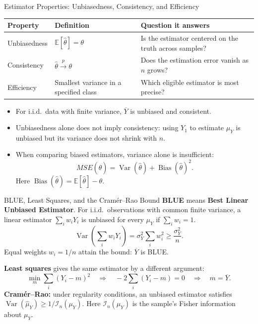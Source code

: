 \documentclass[10pt,aspectratio=169]{beamer}
\newcommand{\E}{\mathbb{E}}
\newcommand{\Var}{\operatorname{Var}}
\begin{document}
\begin{frame}{Estimator Properties: Unbiasedness, Consistency, and Efficiency}
\small
\begin{center}
\begin{tabular}{p{2.7cm}p{4.4cm}p{6cm}}
\toprule
Property & Definition & Question it answers\\
\midrule
Unbiasedness & $\E[\widehat\theta]=\theta$ & Is the estimator centered on the truth across samples?\\[6pt]
Consistency & $\widehat\theta\xrightarrow{p}\theta$ & Does the estimation error vanish as $n$ grows?\\[6pt]
Efficiency & Smallest variance in a specified class & Which eligible estimator is most precise?\\
\bottomrule
\end{tabular}
\end{center}
\begin{itemize}
\item For i.i.d.\ data with finite variance, $\overline Y$ is unbiased and consistent.
\item Unbiasedness alone does not imply consistency: using $Y_1$ to estimate $\mu_Y$ is unbiased but its variance does not shrink with $n$.
\item When comparing biased estimators, variance alone is insufficient:
\[
MSE(\widehat\theta)=\Var(\widehat\theta)+\operatorname{Bias}(\widehat\theta)^2.
\]
Here $\operatorname{Bias}(\widehat\theta)=\E[\widehat\theta]-\theta$.
\end{itemize}
\end{frame}

\begin{frame}{BLUE, Least Squares, and the Cramér--Rao Bound}
\small
\textbf{BLUE} means \textbf{Best Linear Unbiased Estimator}.
For i.i.d.\ observations with common finite variance, a linear estimator $\sum_iw_iY_i$ is unbiased for every $\mu_Y$ if $\sum_iw_i=1$.
\[
\Var\!\left(\sum_iw_iY_i\right)
=\sigma_Y^2\sum_iw_i^2\geq\frac{\sigma_Y^2}{n}.
\]
Equal weights $w_i=1/n$ attain the bound: $\overline Y$ is BLUE.
\par\medskip
\textbf{Least squares} gives the same estimator by a different argument:
\[
\min_m\sum_i(Y_i-m)^2
\quad\Longrightarrow\quad
-2\sum_i(Y_i-m)=0
\quad\Longrightarrow\quad m=\overline Y.
\]
\textbf{Cramér--Rao:} under regularity conditions, an unbiased estimator satisfies
$\Var(\widehat\mu_Y)\geq1/\mathcal I_n(\mu_Y)$.
Here $\mathcal I_n(\mu_Y)$ is the sample's Fisher information about $\mu_Y$.
\end{frame}
\end{document}
